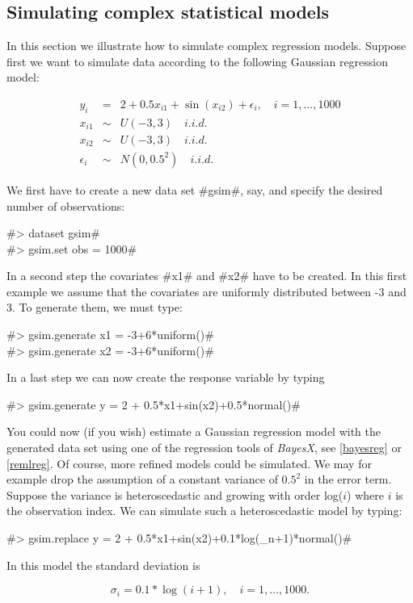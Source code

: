 \subsection{Simulating complex statistical models}
 

In this section we illustrate how to simulate complex regression
models. Suppose first we want to simulate data according to the
following Gaussian regression model:

\begin{eqnarray}
y_i & = & 2 + 0.5 x_{i1} + \sin(x_{i2}) + \epsilon_i, \quad i = 1,\dots,1000 \\
x_{i1} & \sim & U(-3,3) \quad i.i.d.  \\
x_{i2} & \sim & U(-3,3) \quad i.i.d.  \\
\epsilon_i & \sim & N(0,0.5^2) \quad i.i.d.
\end{eqnarray}

We first have to create a new data set #gsim#, say, and specify the desired number of observations:

#> dataset gsim# \\
#> gsim.set obs = 1000#

In a second step the covariates #x1# and #x2# have to be created. In
this first example we
assume that the covariates are uniformly distributed between -3 and 3. To generate them, we must type:

#> gsim.generate x1 = -3+6*uniform()# \\
#> gsim.generate x2 = -3+6*uniform()#

In a last step we can now create the response variable by typing

#> gsim.generate y = 2 + 0.5*x1+sin(x2)+0.5*normal()#

You could now (if you wish) estimate a Gaussian regression model
with the generated data set using one of the regression tools of {\em BayesX}, see
\autoref{bayesreg} or \autoref{remlreg}. Of course, more refined models could be
simulated. We may for example drop the assumption of a constant
variance of $0.5^2$ in the error term. Suppose the variance is
heteroscedastic and growing with order log($i$)
where $i$ is the observation index. We can simulate such a heteroscedastic model by typing:

#> gsim.replace y = 2 + 0.5*x1+sin(x2)+0.1*log(_n+1)*normal()#

In this model the standard deviation is

$$
\sigma_i = 0.1*\log(i+1), \quad  i = 1,\dots,1000.
$$


